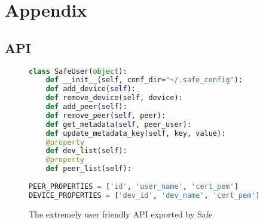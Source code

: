 \setcounter{secnumdepth}{4}
\appendix
\section{Appendix}
\subsection{API}
\label{appendix:api}
\begin{figure}[h]
\begin{lstlisting}[language=Python]
class SafeUser(object):
    def __init__(self, conf_dir="~/.safe_config"):
    def add_device(self):
    def remove_device(self, device):
    def add_peer(self):
    def remove_peer(self, peer):
    def get_metadata(self, peer_user):
    def update_metadata_key(self, key, value):
    @property
    def dev_list(self):
    @property
    def peer_list(self):
    
PEER_PROPERTIES = ['id', 'user_name', 'cert_pem']
DEVICE_PROPERTIES = ['dev_id', 'dev_name', 'cert_pem']
\end{lstlisting}
\caption{The extremely user friendly API exported by Safe}
\end{figure}
